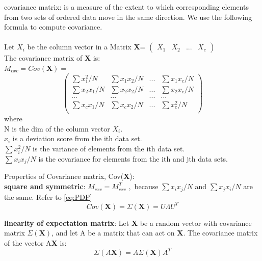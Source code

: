\documentclass[a4paper,12pt]{article}
\begin{document}
\begin{compactitem}
\item covariance matrix: is a measure of the extent to which corresponding elements from two sets
of ordered data move in the same direction. We use the following formula to compute covariance.
\cite{wiki-covariance}\cite{STAT-covariance}\\
\\Let $X_i$ be the column vector in a Matrix \textbf{X}=
$\begin{pmatrix} X_1 & X_2 &... & X_c \end{pmatrix}$\\
The covariance matrix of \textbf{X} is:\\
$M_{cxc} = Cov(\textbf{X})=$
\begin{equation}
\label{eq:covarm1}
\begin{pmatrix}
       \sum x_1^{2}/N 	& \sum x_1 x_2/N 	& ...	& \sum x_1 x_c/N	\\[0.3em]
       \sum x_2 x_1/N 	& \sum x_2 x_2/N 	& ...	& \sum x_2 x_c/N	\\[0.3em]
       ...		& ...			& ...	&	...		\\[0.3em]
       \sum x_c x_1/N 	& \sum x_c x_2/N 	& ...	& \sum x_c^{2}/N	\\[0.3em]
\end{pmatrix}
\end{equation}
where\\
N is the dim of the column vector $X_i$.\\
$x_i$ is a deviation score from the ith data set.\\
$\sum x_i^2 / N$ is the variance of elements from the ith data set.\\
$\sum x_i x_j / N$ is the covariance for elements from the ith and jth data sets.\\

\item Properties of Covariance matrix, Cov(\textbf{X}):\\
\textbf{square and symmetric}: $M_{cxc}=M_{cxc}^T$ ,\ because $\sum x_i x_j / N$ and $\sum x_j x_i / N$ are the same. Refer to \eqref{eq:PDP}
\begin{equation}
\label{eq:covd}
Cov(\textbf{X}) = \Sigma(\textbf{X}) = U\Lambda U^T
\end{equation}

\textbf{linearity of expectation matrix}: Let \textbf{X} be a random vector with covariance matrix
$\Sigma(\textbf{X})$, and let A be a matrix that can act on \textbf{X}. The covariance matrix of the vector A\textbf{X} is:
\begin{equation}
\label{eq:covlinear}
\Sigma(A\textbf{X}) = A\Sigma(\textbf{X})A^{T}
\end{equation}


\end{compactitem}
\end{document}
